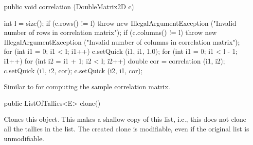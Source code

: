 \begin{htmlonly}
\end{htmlonly}
\begin{code}

   public void correlation (DoubleMatrix2D c)\begin{hide} {
      int l = size();
      if (c.rows() != l)
         throw new IllegalArgumentException
            ("Invalid number of rows in correlation matrix");
      if (c.columns() != l)
         throw new IllegalArgumentException
            ("Invalid number of columns in correlation matrix");
      for (int i1 = 0; i1 < l; i1++)
         c.setQuick (i1, i1, 1.0);
      for (int i1 = 0; i1 < l - 1; i1++)
         for (int i2 = i1 + 1; i2 < l; i2++) {
            double cor = correlation (i1, i2);
            c.setQuick (i1, i2, cor);
            c.setQuick (i2, i1, cor);
         }
   }\end{hide}
\end{code}
\begin{tabb}   Similar to  for computing
 the sample correlation matrix.
\end{tabb}
\begin{htmlonly}
\end{htmlonly}
\begin{code}

   public ListOfTallies<E> clone()\begin{hide} {
      return (ListOfTallies<E>)super.clone();
   }
}\end{hide}
\end{code}
\begin{tabb}   Clones this object.   This makes a shallow copy
  of this list, i.e., this does not clone all the tallies in the list.
  The created clone is modifiable, even if the original list is unmodifiable.
\end{tabb}
